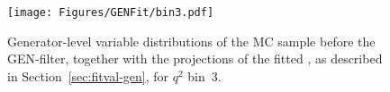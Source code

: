 

\begin{figure}[!hbt]
  \centering
  \texttt{[image: Figures/GENFit/bin3.pdf]}
  \caption{Generator-level variable distributions of the MC sample before the GEN-filter, together with the projections of the fitted \pdf, as described in Section~\ref{sec:fitval-gen}, for $q^2$ bin~3.}
  \label{fig:gen-bin3}
\end{figure}




